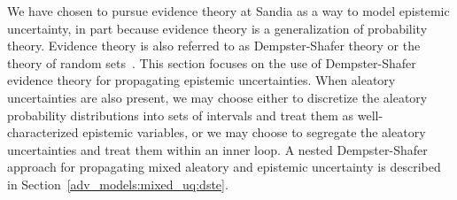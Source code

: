We have chosen to pursue evidence theory at Sandia as a way to model
epistemic uncertainty, in part because evidence theory is a
generalization of probability theory. Evidence theory is also
referred to as Dempster-Shafer theory or the theory of random
sets~\cite{Obe03}. This section focuses on the use of Dempster-Shafer
evidence theory for propagating epistemic uncertainties. When
aleatory uncertainties are also present, we may choose either to
discretize the aleatory probability distributions into sets of
intervals and treat them as well-characterized epistemic variables, or
we may choose to segregate the aleatory uncertainties and treat them
within an inner loop. A nested Dempster-Shafer approach for
propagating mixed aleatory and epistemic uncertainty is described in
Section~\ref{adv_models:mixed_uq:dste}.


